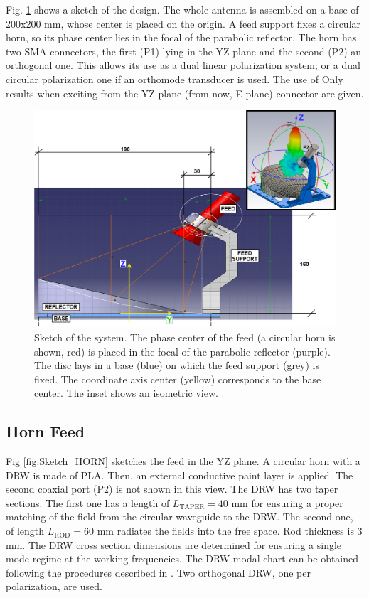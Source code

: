 \documentclass{IEEEtran}
\begin{document}
Fig. \ref{fig:Sketch} shows a sketch of the design. The whole antenna is assembled on a base of 200x200 mm, whose center is placed on the origin. A feed support fixes a circular horn, so its phase center lies in the focal of the parabolic reflector. The horn has two SMA connectors, the first (P1) lying in the YZ plane and the second (P2) an orthogonal one. This allows its use as a dual linear polarization system; or a dual circular polarization one if an orthomode transducer is used. The use of Only results when exciting from the YZ plane (from now, E-plane) connector are given.

\begin{figure}[h]
	\centerline{\includegraphics[width=\columnwidth]{images/Sketch.png}}
	\caption{Sketch of the system. The phase center of the feed (a circular horn is shown, red) is placed in the focal of the parabolic reflector (purple). The disc lays in a base (blue) on which the feed support (grey) is fixed. The coordinate axis center (yellow) corresponds to the base center. The inset shows an isometric view.}
	\label{fig:Sketch}
\end{figure}

\subsection{Horn Feed}

Fig \ref{fig:Sketch_HORN} sketches the feed in the YZ plane. A circular horn with a DRW is made of PLA. Then, an external conductive paint layer is applied. The second coaxial port (P2) is not shown in this view. The DRW has two taper sections. The first one has a length of $L_\text{TAPER}=40$ mm for ensuring a proper matching of the field from the circular waveguide to the DRW. The second one, of length $L_\text{ROD}=60$ mm radiates the fields into the free space. Rod thickness is 3 mm. The DRW cross section dimensions are determined for ensuring a single mode regime at the working frequencies. The DRW modal chart can be obtained following the procedures described in \cite{ref:Yeh2008,ref:DRWModal1,ref:DRWModal2}. Two orthogonal DRW, one per polarization, are used.
\end{document}
